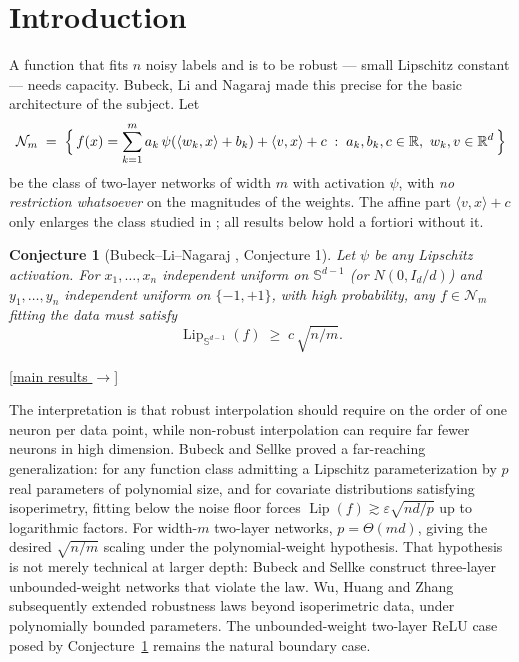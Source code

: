 \documentclass[11pt,reqno]{amsart}
\theoremstyle{plain}
\newtheorem{conjecture}[theorem]{Conjecture}
\theoremstyle{definition}
\theoremstyle{remark}
\newcommand{\R}{\mathbb{R}}
\newcommand{\Sd}{\mathbb{S}^{d-1}}
\newcommand{\Lip}{\operatorname{Lip}}
\newcommand{\NN}{\mathcal{N}}
\newcommand{\inn}[2]{\langle #1,#2\rangle}
\begin{document}
\section{Introduction}\label{sec:intro}

A function that fits $n$ noisy labels and is to be robust --- small Lipschitz constant --- needs capacity. Bubeck, Li and Nagaraj \cite{BLN} made this precise for the basic architecture of the subject. Let
\begin{equation}\label{eq:class}
\NN_m \;=\;\Bigl\{\,f(x)=\sum_{k=1}^{m}a_k\,\psi(\inn{w_k}{x}+b_k)+\inn{v}{x}+c\;:\;a_k,b_k,c\in\R,\ w_k,v\in\R^d\,\Bigr\}
\end{equation}
be the class of two-layer networks of width $m$ with activation $\psi$, with \emph{no restriction whatsoever} on the magnitudes of the weights. The affine part $\inn{v}{x}+c$ only enlarges the class studied in \cite{BLN}; all results below hold a fortiori without it.

\begin{conjecture}[Bubeck--Li--Nagaraj \cite{BLN}, Conjecture 1]\label{conj:bln}
Let $\psi$ be any Lipschitz activation. For $x_1,\dots,x_n$ independent uniform on $\Sd$ (or $N(0,I_d/d)$) and $y_1,\dots,y_n$ independent uniform on $\{-1,+1\}$, with high probability, any $f\in\NN_m$ fitting the data must satisfy
\[
\Lip_{\Sd}(f)\;\ge\;c\,\sqrt{n/m}.
\]
\end{conjecture}
\hyperref[thm:main]{[main results $\to$]}


The interpretation is that robust interpolation should require on the order of one neuron per data point, while non-robust interpolation can require far fewer neurons in high dimension. Bubeck and Sellke \cite{BS} proved a far-reaching generalization: for any function class admitting a Lipschitz parameterization by $p$ real parameters of polynomial size, and for covariate distributions satisfying isoperimetry, fitting below the noise floor forces $\Lip(f)\gtrsim\varepsilon\sqrt{nd/p}$ up to logarithmic factors. For width-$m$ two-layer networks, $p=\Theta(md)$, giving the desired $\sqrt{n/m}$ scaling under the polynomial-weight hypothesis. That hypothesis is not merely technical at larger depth: Bubeck and Sellke construct three-layer unbounded-weight networks that violate the law. Wu, Huang and Zhang \cite{WHZ} subsequently extended robustness laws beyond isoperimetric data, under polynomially bounded parameters. The unbounded-weight two-layer ReLU case posed by Conjecture~\ref{conj:bln} remains the natural boundary case.
\end{document}
